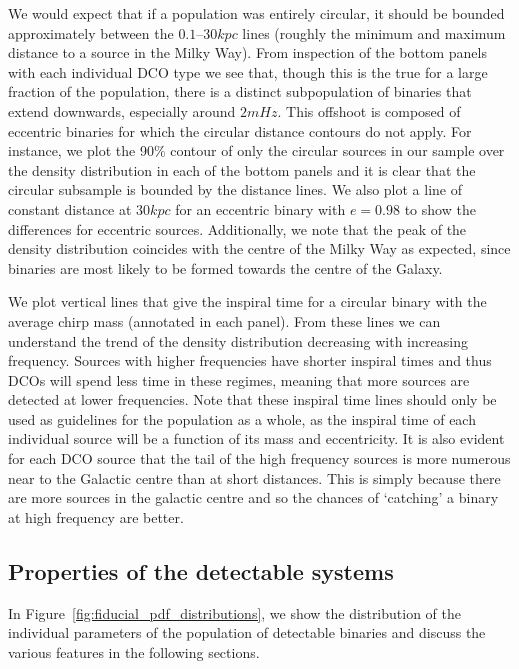 We would expect that if a population was entirely circular, it should be bounded approximately between the $0.1$--$30 \unit{kpc}$ lines (roughly the minimum and maximum distance to a source in the Milky Way). From inspection of the bottom panels with each individual DCO type we see that, though this is the true for a large fraction of the population, there is a distinct subpopulation of binaries that extend downwards, especially around $2 \unit{mHz}$. This offshoot is composed of eccentric binaries for which the circular distance contours do not apply. For instance, we plot the 90\% contour of only the circular sources in our sample over the density distribution in each of the bottom panels and it is clear that the circular subsample is bounded by the distance lines. We also plot a line of constant distance at $30 \unit{kpc}$ for an eccentric binary with $e = 0.98$ to show the differences for eccentric sources. Additionally, we note that the peak of the density distribution coincides with the centre of the Milky Way as expected, since binaries are most likely to be formed towards the centre of the Galaxy.

We plot vertical lines that give the inspiral time for a circular binary with the average chirp mass (annotated in each panel). From these lines we can understand the trend of the density distribution decreasing with increasing frequency. Sources with higher frequencies have shorter inspiral times and thus DCOs will spend less time in these regimes, meaning that more sources are detected at lower frequencies. Note that these inspiral time lines should only be used as guidelines for the population as a whole, as the inspiral time of each individual source will be a function of its mass and eccentricity. It is also evident for each DCO source that the tail of the high frequency sources is more numerous near to the Galactic centre than at short distances. This is simply because there are more sources in the galactic centre and so the chances of `catching' a binary at high frequency are better.

\subsection{Properties of the detectable systems}\label{sec:fiducial_distributions}

In Figure~\ref{fig:fiducial_pdf_distributions}, we show the distribution of the individual parameters of the population of detectable binaries and discuss the various features in the following sections.

